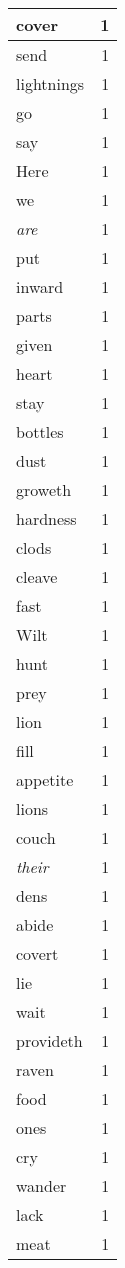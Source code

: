 \begin{center}
\begin{longtable}{l|r}
cover & 1 \\ \hline
send & 1 \\ \hline
lightnings & 1 \\ \hline
go & 1 \\ \hline
say & 1 \\ \hline
Here & 1 \\ \hline
we & 1 \\ \hline
\emph{are} & 1 \\ \hline
put & 1 \\ \hline
inward & 1 \\ \hline
parts & 1 \\ \hline
given & 1 \\ \hline
heart & 1 \\ \hline
stay & 1 \\ \hline
bottles & 1 \\ \hline
dust & 1 \\ \hline
groweth & 1 \\ \hline
hardness & 1 \\ \hline
clods & 1 \\ \hline
cleave & 1 \\ \hline
fast & 1 \\ \hline
Wilt & 1 \\ \hline
hunt & 1 \\ \hline
prey & 1 \\ \hline
lion & 1 \\ \hline
fill & 1 \\ \hline
appetite & 1 \\ \hline
lions & 1 \\ \hline
couch & 1 \\ \hline
\emph{their} & 1 \\ \hline
dens & 1 \\ \hline
abide & 1 \\ \hline
covert & 1 \\ \hline
lie & 1 \\ \hline
wait & 1 \\ \hline
provideth & 1 \\ \hline
raven & 1 \\ \hline
food & 1 \\ \hline
ones & 1 \\ \hline
cry & 1 \\ \hline
wander & 1 \\ \hline
lack & 1 \\ \hline
meat & 1 \\ \hline
\end{longtable}
\end{center}



